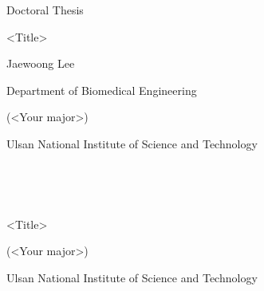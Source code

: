 \documentclass[11pt,a4paper,onecolumn,oneside]{report}
\begin{document}
    \begin{center}
    \LARGE Doctoral Thesis

    \vspace{3cm}
    \huge <Title>

    \vfill

    \LARGE Jaewoong Lee

    \vspace{2cm}

    \LARGE Department of Biomedical Engineering

    \LARGE (<Your major>)

    \vspace{2cm}

    \LARGE Ulsan National Institute of Science and Technology
    \vspace{2cm}

    \LARGE \the\year{}

    \end{center}
    \thispagestyle{empty}
    \clearpage

    \begin{center}
    \hbox{ }

    \hbox{ }

    \huge <Title>

    \vspace{5cm}


    \vspace{6cm}


    \LARGE (<Your major>)

    \vspace{2cm}

    \LARGE Ulsan National Institute of Science and Technology

    \end{center}
    \thispagestyle{empty}
    \clearpage

    
\end{document}
